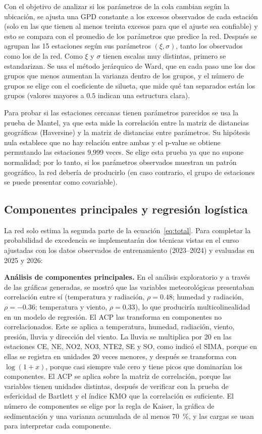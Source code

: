 \documentclass[11pt]{article}
\begin{document}
Con el objetivo de analizar si los parámetros de la cola cambian según la ubicación, se ajusta una GPD constante a los excesos observados de cada estación (solo en las que tienen al menos treinta excesos para que el ajuste sea confiable) y esto se compara con el promedio de los parámetros que predice la red. Después se agrupan las 15 estaciones según sus parámetros $(\xi, \sigma)$, tanto los observados como los de la red. Como $\xi$ y $\sigma$ tienen escalas muy distintas, primero se estandarizan. Se usa el método jerárquico de Ward, que en cada paso une los dos grupos que menos aumentan la varianza dentro de los grupos, y el número de grupos se elige con el coeficiente de silueta, que mide qué tan separados están los grupos (valores mayores a $0.5$ indican una estructura clara).

Para probar si las estaciones cercanas tienen parámetros parecidos se usa la prueba de Mantel, ya que esta mide la correlación entre la matriz de distancias geográficas (Haversine) y la matriz de distancias entre parámetros. Su hipótesis nula establece que no hay relación entre ambas y el p-value se obtiene permutando las estaciones 9{,}999 veces. Se elige esta prueba ya que no supone normalidad; por lo tanto, si los parámetros observados muestran un patrón geográfico, la red debería de producirlo (en caso contrario, el grupo de estaciones se puede presentar como covariable).

\subsection{Componentes principales y regresión logística}
La red solo estima la segunda parte de la ecuación~\eqref{eq:total}. Para completar la probabilidad de excedencia se implementarán dos técnicas vistas en el curso ajustadas con los datos observados de entrenamiento (2023--2024) y evaluadas en 2025 y 2026: 


\textbf{Análisis de componentes principales.} En el análisis exploratorio y a través de las gráficas generadas, se mostró que las variables meteorológicas presentaban correlación entre sí (temperatura y radiación, $\rho = 0.48$; humedad y radiación, $\rho = -0.36$; temperatura y viento, $\rho = 0.33$), lo que produciría multicolinealidad en un modelo de regresión. El ACP las transforma en componentes no correlacionados. Este se aplica a temperatura, humedad, radiación, viento, presión, lluvia y dirección del viento. La lluvia se multiplica por 20 en las estaciones CE, NE, NO2, NO3, NTE2, SE y SO, como indicó el SIMA, porque en ellas se registra en unidades 20 veces menores, y después se transforma con $\log(1+x)$, porque casi siempre vale cero y tiene picos que dominarían los componentes. El ACP se aplica sobre la matriz de correlación, porque las variables tienen unidades distintas, después de verificar con la prueba de esfericidad de Bartlett y el índice KMO que la correlación es suficiente. El número de componentes se elige por la regla de Kaiser, la gráfica de sedimentación y una varianza acumulada de al menos 70~\%, y las cargas se usan para interpretar cada componente.
\end{document}

